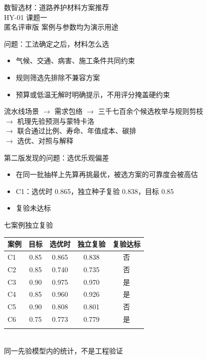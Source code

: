 \documentclass[UTF8,fontset=none,aspectratio=169,10pt]{ctexbeamer}
\begin{document}
\begin{frame}{数智选材：道路养护材料方案推荐}\\[1em]HY-01 课题一\\[1em]\small 匿名评审版 \quad 案例与参数均为演示用途\end{frame}
\begin{frame}{问题：工法确定之后，材料怎么选}\begin{itemize}\item 气候、交通、病害、施工条件共同约束\item 规则筛选先排除不兼容方案\item 预算或低温无解时明确提示，不用评分掩盖硬约束\end{itemize}\end{frame}
\begin{frame}{流水线}\centering 场景 $\to$ 需求包络 $\to$ 三千七百余个候选枚举与规则剪枝\\$\to$ 机理先验预测与蒙特卡洛\\$\to$ 联合通过比例、寿命、年值成本、碳排\\$\to$ 选优、对照与解释\end{frame}
\begin{frame}{第二版发现的问题：选优乐观偏差}\begin{itemize}\item 在同一批抽样上先算再挑最优，被选方案的可靠度会被高估\item C1：选优时 0.865，独立种子复验 0.838，目标 0.85\item 复验未达标\end{itemize}\end{frame}
\begin{frame}{七案例独立复验}\small\begin{tabular}{lcccc}\toprule 案例&目标&选优时&独立复验&复验达标\\\midrule C1 & 0.85 & 0.865 & 0.838 & 否 \\
C2 & 0.85 & 0.740 & 0.735 & 否 \\
C3 & 0.90 & 0.975 & 0.970 & 是 \\
C4 & 0.85 & 0.960 & 0.926 & 是 \\
C5 & 0.90 & 0.808 & 0.801 & 否 \\
C6 & 0.75 & 0.773 & 0.779 & 是 \\\\\bottomrule\end{tabular}\\[.6em]{\scriptsize 同一先验模型内的统计，不是工程验证}\end{frame}
\end{document}
